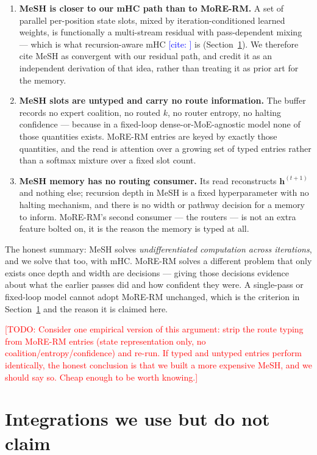 \documentclass[11pt]{article}
\newcommand{\TODO}[1]{\textcolor{red}{[TODO: #1]}}
\newcommand{\CITE}[1]{\textcolor{blue}{[cite: \detokenize{#1}]}}
\begin{document}
\begin{enumerate}
\item \textbf{MeSH is closer to our mHC path than to MoRE-RM.} A set of parallel
per-position state slots, mixed by iteration-conditioned learned weights, is
functionally a multi-stream residual with pass-dependent mixing --- which is what
recursion-aware mHC \CITE{hyperconnections2024} is (Section~\ref{sec:integrations}).
We therefore cite MeSH as convergent with our residual path, and credit it as an
independent derivation of that idea, rather than treating it as prior art for the
memory.
\item \textbf{MeSH slots are untyped and carry no route information.} The buffer
records no expert coalition, no routed $k$, no router entropy, no halting
confidence --- because in a fixed-loop dense-or-MoE-agnostic model none of those
quantities exists. MoRE-RM entries are keyed by exactly those quantities, and the
read is attention over a growing set of typed entries rather than a softmax
mixture over a fixed slot count.
\item \textbf{MeSH memory has no routing consumer.} Its read reconstructs
$\mathbf{h}^{(t+1)}$ and nothing else; recursion depth in MeSH is a fixed
hyperparameter with no halting mechanism, and there is no width or pathway
decision for a memory to inform. MoRE-RM's second consumer --- the routers --- is
not an extra feature bolted on, it is the reason the memory is typed at all.
\end{enumerate}

The honest summary: MeSH solves \emph{undifferentiated computation across
iterations}, and we solve that too, with mHC. MoRE-RM solves a different problem
that only exists once depth and width are decisions --- giving those decisions
evidence about what the earlier passes did and how confident they were. A
single-pass or fixed-loop model cannot adopt MoRE-RM unchanged, which is the
criterion in Section~\ref{sec:integrations} and the reason it is claimed here.

\TODO{Consider one empirical version of this argument: strip the route typing
from MoRE-RM entries (state representation only, no coalition/entropy/confidence)
and re-run. If typed and untyped entries perform identically, the honest
conclusion is that we built a more expensive MeSH, and we should say so. Cheap
enough to be worth knowing.}

\section{Integrations we use but do not claim}
\label{sec:integrations}
\end{document}
